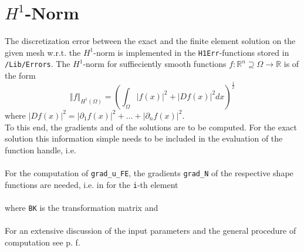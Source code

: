 
\section{$H^1$-Norm}  \label{sect:h1_err}

 The discretization error between the exact and the finite element solution on the given mesh w.r.t. the $H^1$-norm is implemented in the {\tt H1Err}-functions stored in {\tt /Lib/Errors}. The $H^1$-norm for suffieciently smooth functions $f: \mathbb{R}^n \supseteq \Omega \rightarrow \mathbb{R}$ is of the form
\begin{equation} \label{eq:H1_norm}
	\Vert f \Vert_{H^1(\Omega)} = \left( \int_{\Omega} |f(x)|^2 + |D f(x)|^2 dx \right) ^{\frac{1}{2}}
\end{equation} 
 where $|D f(x)|^2 = |\partial_1 f(x)|^2+\ldots+ |\partial_n f(x)|^2$. \\

 To this end, the gradients  and  of the solutions are to be computed. For the exact solution this information simple needs to be included in the evaluation of the function handle, i.e. \\

  \\

 For the computation of {\tt grad\_u\_FE}, the gradients {\tt grad\_N} of the respective shape functions are needed, i.e. in  for the {\tt i}-th element \\

 \\

 where {\tt BK} is the transformation matrix and \\

 \\

 For an extensive discussion of the input parameters and the general procedure of computation see p. \pageref{chap:err}f.


